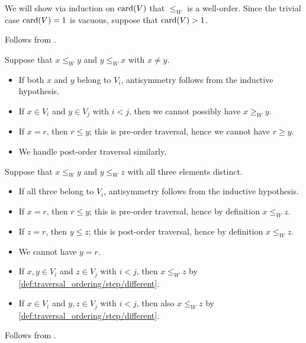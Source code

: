\begin{defproof}
  We will show via induction on \( \operatorname{card}(V) \) that \( \leq_W \) is a well-order. Since the trivial case \( \operatorname{card}(V) = 1 \) is vacuous, suppose that \( \operatorname{card}(V) > 1 \).

   Follows from .

   Suppose that \( x \leq_W y \) and \( y \leq_W x \) with \( x \neq y \).
  \begin{itemize}
    \item If both \( x \) and \( y \) belong to \( V_i \), antisymmetry follows from the inductive hypothesis.
    \item If \( x \in V_i \) and \( y \in V_j \) with \( i < j \), then we cannot possibly have \( x \geq_W y \).
    \item If \( x = r \), then \( r \leq y \); this is pre-order traversal, hence we cannot have \( r \geq y \).
    \item We handle post-order traversal similarly.
  \end{itemize}

   Suppose that \( x \leq_W y \) and \( y \leq_W z \) with all three elements distinct.
  \begin{itemize}
    \item If all three belong to \( V_i \), antisymmetry follows from the inductive hypothesis.
    \item If \( x = r \), then \( r \leq y \); this is pre-order traversal, hence by definition \( x \leq_W z \).
    \item If \( z = r \), then \( y \leq z \); this is post-order traversal, hence by definition \( x \leq_W z \).
    \item We cannot have \( y = r \).
    \item If \( x, y \in V_i \) and \( z \in V_j \) with \( i < j \), then \( x \leq_W z \) by \ref{def:traversal_ordering/step/different}.
    \item If \( x \in V_i \) and \( y, z \in V_j \) with \( i < j \), then also \( x \leq_W z \) by \ref{def:traversal_ordering/step/different}.
  \end{itemize}

   Follows from .
\end{defproof}

